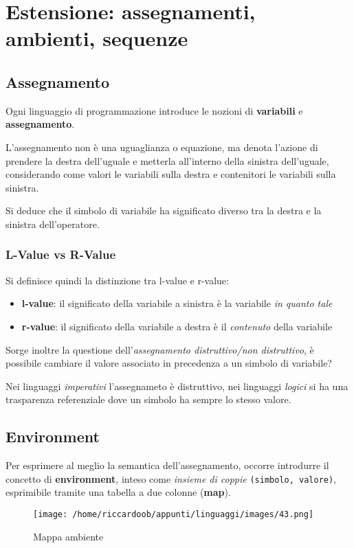 \chapter{Estensione: assegnamenti, ambienti, sequenze}

\section{Assegnamento}
Ogni linguaggio di programmazione introduce le nozioni di \textbf{variabili} e \textbf{assegnamento}.

L'assegnamento non è una uguaglianza o equazione, ma denota l'azione di prendere la destra dell'uguale e metterla all'interno della sinistra dell'uguale, considerando come valori le variabili sulla destra e contenitori le variabili sulla sinistra.

Si deduce che il simbolo di variabile ha significato diverso tra la destra e la sinistra dell'operatore.

\subsection{L-Value vs R-Value}
Si definisce quindi la distinzione tra l-value e r-value:
\begin{itemize}
    \item \textbf{l-value}: il significato della variabile a sinistra è la variabile \textit{in quanto tale}
    \item \textbf{r-value}: il significato della variabile a destra è il \textit{contenuto} della variabile
\end{itemize}

Sorge inoltre la questione dell'\textit{assegnamento distruttivo/non distruttivo}, è possibile cambiare il valore associato in precedenza a un simbolo di variabile?

Nei linguaggi \textit{imperativi} l'assegnameto è distruttivo, nei linguaggi \textit{logici} si ha una trasparenza referenziale dove un simbolo ha sempre lo stesso valore.

\section{Environment}
Per esprimere al meglio la semantica dell'assegnamento, occorre introdurre il concetto di \textbf{environment}, inteso come \textit{insieme di coppie} \texttt{(simbolo, valore)}, esprimibile tramite una tabella a due colonne (\textbf{map}).

\begin{figure}[H]
    \caption{Mappa ambiente}
    \centering
    \texttt{[image: /home/riccardoob/appunti/linguaggi/images/43.png]}
\end{figure}

